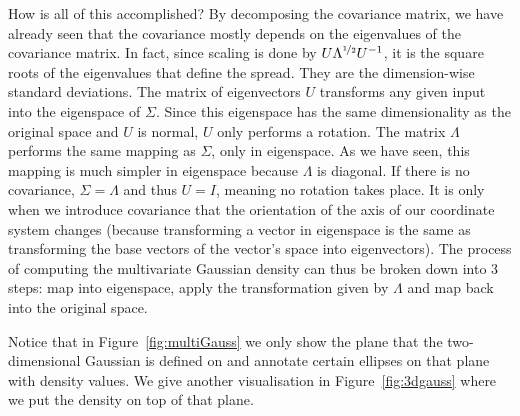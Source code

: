 \documentclass[a4paper,11pt,leqno]{report}\usepackage[]{graphicx}\usepackage[]{color}
\begin{document}
How is all of this accomplished? By decomposing the covariance matrix, we have already seen that the covariance mostly depends on the eigenvalues of the covariance matrix.
In fact, since scaling is done by $ U\Lambda^{\nicefrac{1}{2}} U^{-1} $, it is the square roots of the eigenvalues that define the spread. They are the dimension-wise 
standard deviations. The matrix of eigenvectors $ U $ transforms any given input into the eigenspace of $ \Sigma $. Since this eigenspace has the same dimensionality
as the original space and $ U $ is normal, $ U $ only performs a rotation.
The matrix $ \Lambda $ performs the same mapping as $ \Sigma $, only in eigenspace. As we have seen, this mapping is much simpler in eigenspace because $ \Lambda $ is
diagonal. If there is no covariance, $ \Sigma = \Lambda $ and thus $ U=I $, meaning no rotation takes place. 
It is only when we introduce covariance that the orientation of the
axis of our coordinate system changes (because transforming a vector in eigenspace is the same as transforming the base vectors of the vector's space into
eigenvectors). The process of computing the multivariate Gaussian density can thus be broken down 
into 3 steps: map into eigenspace, apply the transformation given by $ \Lambda $ and map back into the original space. 

Notice that in Figure~\ref{fig:multiGauss} we only show the plane that the two-dimensional Gaussian is defined on and annotate certain ellipses on that plane with
density values. We give another visualisation in Figure~\ref{fig:3dgauss} where we put the density on top of that plane.
\end{document}
